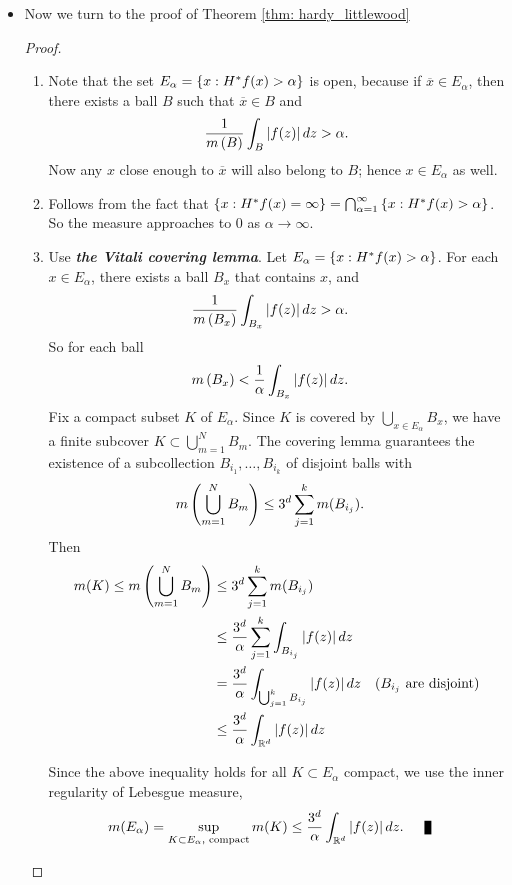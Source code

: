 \documentclass[11pt]{article}
\begin{document}
\begin{itemize}
\item Now we turn to the proof of Theorem \ref{thm: hardy_littlewood}
\begin{proof}
\begin{enumerate}
\item Note that the set $E_{\alpha} = \left\{x: H^{*}f(x)> \alpha\right\}$ is open, because if $\overline{x}\in E_{\alpha} $, then there exists a ball $B$ such that $\overline{x}\in B$ and
\begin{align*}
\frac{1}{m\left(B\right)}\int_{B}\left\lvert f(z) \right\rvert dz >\alpha.
\end{align*}
Now any $x$ close enough to $\overline{x}$ will also belong to $B$; hence $x\in E_{\alpha}$ as well. 

\item Follows from the fact that $\left\{x: H^{*}f(x)= \infty\right\}= \bigcap_{\alpha=1}^{\infty}\left\{x: H^{*}f(x)> \alpha\right\}$. So the measure approaches to $0$ as $\alpha\rightarrow \infty$. 

\item Use \emph{\textbf{the Vitali covering lemma}}. Let $E_{\alpha}=\left\{x: H^{*}f(x)> \alpha\right\} $. For each $x\in E_{\alpha}$, there exists a ball $B_{x}$ that contains $x$, and 
\begin{align*}
\frac{1}{m\left(B_{x}\right)}\int_{B_{x}}\left\lvert f(z) \right\rvert dz&>\alpha.
\end{align*}
So for each ball 
\begin{align*}
m\left(B_{x}\right) &< \frac{1}{\alpha}\int_{B_{x}}\left\lvert f(z) \right\rvert dz.
\end{align*}
Fix a compact subset $K$ of $E_{\alpha}$. Since $K$ is covered by $\bigcup_{x\in E_{\alpha}}B_{x}$, we have a finite subcover $K\subset \bigcup_{m=1}^{N}B_{m}$. The covering lemma guarantees the existence of a subcollection $B_{i_1}, \ldots, B_{i_k}$ of disjoint balls with 
\begin{align*}
m\left(\bigcup_{m=1}^{N}B_{m}\right) &\le 3^{d} \sum_{j=1}^{k}m(B_{i_j}). 
\end{align*}
Then
\begin{align*}
m(K) \le m\left(\bigcup_{m=1}^{N}B_{m}\right) &\le 3^{d} \sum_{j=1}^{k}m(B_{i_j})\\
&\le \frac{3^{d}}{\alpha}\sum_{j=1}^{k}\int_{B_{i_j}}\left\lvert f(z) \right\rvert dz\\
&= \frac{3^{d}}{\alpha}\int_{\bigcup_{j=1}^{k}B_{i_j}}\left\lvert f(z) \right\rvert dz \quad (B_{i_j} \text{ are disjoint})\\
&\le  \frac{3^{d}}{\alpha}\int_{{\mathbb R}^{d}}\left\lvert f(z) \right\rvert dz
\end{align*}

Since the above inequality holds for all $K\subset E_{\alpha}$ compact, we use the inner regularity of Lebesgue measure, 
\begin{align*}
m(E_{\alpha}) =\sup_{K\subset E_{\alpha}, \text{ compact}}m(K) &\le  \frac{3^{d}}{\alpha}\int_{\bR^{d}}\abs{f(z)}dz.\qed
\end{align*}
\end{enumerate}
\end{proof}
\end{itemize}
\end{document}
